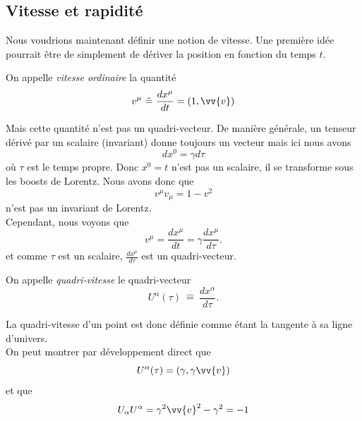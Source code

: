 \documentclass[a4paper,11pt]{report}
\begin{document}
        \subsection{Vitesse et rapidité}
        
            Nous voudrions maintenant définir une notion de vitesse. Une première idée pourrait être de simplement de dériver la position en fonction du temps $t$.
            \begin{definition}
                On appelle \textit{vitesse ordinaire} la quantité
                \begin{equation}
                v^\mu ~\hat{=}~ \frac{dx^\mu}{dt} = (1,\vv{v})
                \end{equation}
            \end{definition}
            Mais cette quantité n'est pas un quadri-vecteur. De manière générale, un tenseur dérivé par un scalaire (invariant) donne toujours un vecteur mais ici nous avons
            \begin{equation}
                dx^0 = \gamma d\tau
            \end{equation}
            où $\tau$ est le temps propre. Donc $x^0 = t$ n'est pas un scalaire, il se transforme sous les boosts de Lorentz. Nous avons donc que 
            \begin{equation}
                v^\mu v_\mu = 1-v^2 
            \end{equation}
            n'est pas un invariant de Lorentz.\\
            Cependant, nous voyons que
            \begin{equation}
                v^\mu = \frac{dx^\mu}{dt} = \gamma \frac{dx^\mu}{d\tau}.
            \end{equation}
            et comme $\tau$ est un scalaire, $\frac{dx^\mu}{d\tau}$ est un quadri-vecteur.
            \begin{definition}
                On appelle \textit{quadri-vitesse} le quadri-vecteur
                \begin{equation}
                    U^\alpha(\tau) ~\hat{=}~ \frac{dx^\alpha}{d\tau}.
                \end{equation}
            \end{definition}
            La quadri-vitesse d'un point est donc définie comme étant la tangente à sa ligne d'univers.\\
            On peut montrer par développement direct que 
            \begin{equation}
                U^\alpha(\tau) = (\gamma,\gamma\vv{v})
            \end{equation}
            et que 
            \begin{equation}
                U_\alpha U^\alpha = \gamma^2\vv{v}^2-\gamma^2 = -1
            \end{equation}
        
\end{document}
